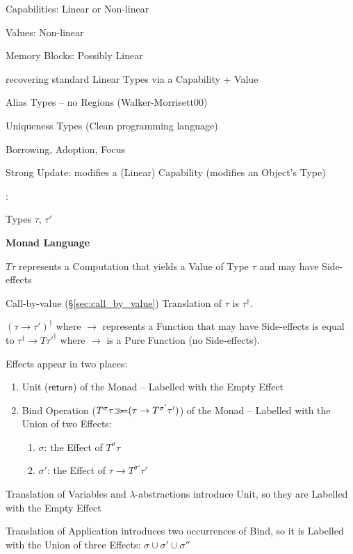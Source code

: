 Capabilities: Linear or Non-linear

Values: Non-linear

Memory Blocks: Possibly Linear

recovering standard Linear Types via a Capability + Value

Alias Types -- no Regions (Walker-Morrisett00) %

Uniqueness Types (Clean programming language)

Borrowing, Adoption, Focus %

Strong Update: modifies a (Linear) Capability (modifies an Object's
Type)



\asterism


\cite{wadler-thiemann03}:

Types $\tau$, $\tau'$


\textbf{Monad Language}

$T \tau$ represents a Computation that yields a Value
of Type $\tau$ and may have Side-effects

Call-by-value (\S\ref{sec:call_by_value}) Translation of $\tau$ is
$\tau^\dag$.

$(\tau \rightarrow \tau')^\dag$ where $\rightarrow$ represents a
Function that may have Side-effects is equal to $\tau^\dag \rightarrow
T \tau'^\dag$ where $\rightarrow$ is a Pure Function (no Side-effects).

Effects appear in two places:
\begin{enumerate}
  \item Unit ($\mathsf{return}$) of the Monad -- Labelled with the
    Empty Effect
  \item Bind Operation ($T^\sigma\tau \mathsf{\gg\kern-3pt=} (\tau \rightarrow
    T^{\sigma'}\tau')$) of the Monad -- Labelled with the Union of two
    Effects: %
    \begin{enumerate}
      \item $\sigma$: the Effect of $T^\sigma\tau$
      \item $\sigma'$: the Effect of $\tau \rightarrow
        T^{\sigma'}\tau'$
    \end{enumerate}
\end{enumerate}

Translation of Variables and $\lambda$-abstractions introduce Unit, so
they are Labelled with the Empty Effect

Translation of Application introduces two occurrences of Bind, so it
is Labelled with the Union of three Effects: $\sigma \cup \sigma' \cup
\sigma''$ %


